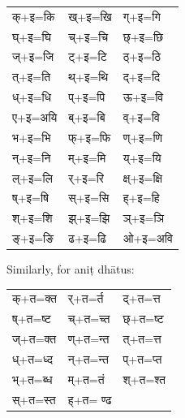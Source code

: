 \begin{center}
	\begin{tabular}{ p{4cm} p{4cm} p{4cm} }
		
		\texthindi{क्+इ=कि}&
		\texthindi{ख्+इ=खि}&
		\texthindi{ग्+इ=गि}\\
		\texthindi{घ्+इ=घि}&
		\texthindi{च्+इ=चि}&
		\texthindi{छ्+इ=छि}\\
		\texthindi{ज्+इ=जि}&
		\texthindi{ट्+इ=टि}&
		\texthindi{ठ्+इ=ठि}\\
		\texthindi{त्+इ=ति}&
		\texthindi{थ्+इ=थि}&
		\texthindi{द्+इ=दि}\\
		\texthindi{ध्+इ=धि}&
		\texthindi{प्+इ=पि}&
		\texthindi{ऊ+इ=वि}\\
		\texthindi{ए+इ=अयि}&
		\texthindi{ब्+इ=बि}&
		\texthindi{व्+इ=वि}\\
		\texthindi{भ+इ=भि}&
		\texthindi{फ्+इ=फि}&
		\texthindi{ण्+इ=णि}\\
		\texthindi{न्+इ=नि}&
		\texthindi{म्+इ=मि}&
		\texthindi{य्+इ=यि}\\
		\texthindi{ल्+इ=लि}&
		\texthindi{र्+इ=रि}&
		\texthindi{क्ष्+इ=क्षि}\\
		\texthindi{ष्+इ=षि}&
		\texthindi{स्+इ=सि}&
		\texthindi{ह्+इ=हि}\\
		\texthindi{श्+इ=शि}&
		\texthindi{झ्+इ=झि}&
		\texthindi{ञ्+इ=ञि}\\
		\texthindi{ङ्+इ=ङि}&
		\texthindi{ढ+इ=ढि}&
		\texthindi{ओ+इ=अवि}\\
		
	\end{tabular}
\end{center}


Similarly, for aniṭ dhātus:
\\
\begin{center}
	\begin{tabular}{ p{4cm} p{4cm} p{4cm}}
		\texthindi{क्+त=क्त}&
		\texthindi{ र्+त=र्त}&
		\texthindi{ द्+त=त्त}\\
		\texthindi{ ष्+त=ष्ट}&
		\texthindi{ च्+त=च्त}&
		\texthindi{ छ्+त=ष्ट}\\
		\texthindi{ ज्+त=क्त}&
		\texthindi{ ण्+त=न्त}&
		\texthindi{ त्+त=त्त}\\
		\texthindi{ ध्+त=ध्द}&
		\texthindi{ न्+त=न्त}&
		\texthindi{ प्+त=प्त}\\
		\texthindi{ भ्+त=ब्ध}&
		\texthindi{ म्+त=तं}&
		\texthindi{ श्+त=श्त}\\
		\texthindi{ स्+त=स्त}&
		\texthindi{ ह्+त= ण्ढ}&
		
	\end{tabular}
\end{center}

